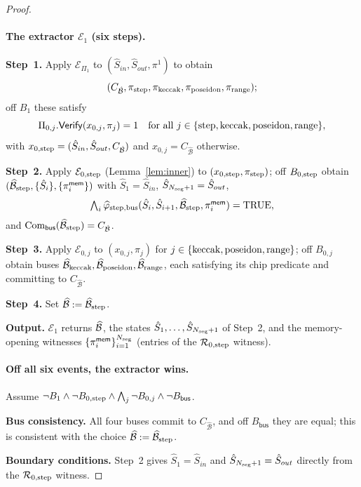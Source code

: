 \begin{proof}
\paragraph{The extractor $\mathcal{E}_1$ (six steps).}

\textbf{Step~1.} Apply $\mathcal{E}_{\Pi_1}$ to $(\hat{S}_{in},\hat{S}_{out},\pi^1)$
to obtain
\[
  (C_{\hat{\mathcal{B}}},\pi_{\mathrm{step}},\pi_{\mathrm{keccak}},\pi_{\mathrm{poseidon}},\pi_{\mathrm{range}});
\]
off $B_1$ these satisfy
\[
  \Pi_{0,j}.\mathsf{Verify}(x_{0,j},\pi_j)=1
  \quad\text{for all }j\in\{\mathrm{step},\mathrm{keccak},\mathrm{poseidon},\mathrm{range}\},
\]
with $x_{0,\mathrm{step}}=(\hat{S}_{in},\hat{S}_{out},C_{\hat{\mathcal{B}}})$ and
$x_{0,j}=C_{\hat{\mathcal{B}}}$ otherwise.

\textbf{Step~2.} Apply $\mathcal{E}_{0,\mathrm{step}}$ (Lemma~\ref{lem:inner}) to
$(x_{0,\mathrm{step}},\pi_{\mathrm{step}})$; off $B_{0,\mathrm{step}}$ obtain
$(\widehat{\mathcal{B}}_{\mathrm{step}},\{\hat{S}_i\},\{\pi^{\mathsf{mem}}_i\})$ with
$\hat{S}_1=\hat{S}_{in}$, $\hat{S}_{N_{\mathrm{seg}}+1}=\hat{S}_{out}$,
\[
  \textstyle\bigwedge_i\widehat{\varphi}_{\mathrm{step},\mathrm{bus}}(\hat{S}_i,\hat{S}_{i+1},\widehat{\mathcal{B}}_{\mathrm{step}},\pi^{\mathsf{mem}}_i)=\mathrm{TRUE},
\]
and $\mathrm{Com}_{\mathsf{bus}}(\widehat{\mathcal{B}}_{\mathrm{step}})=C_{\hat{\mathcal{B}}}$.

\textbf{Step~3.} Apply $\mathcal{E}_{0,j}$ to $(x_{0,j},\pi_j)$ for
$j\in\{\mathrm{keccak},\mathrm{poseidon},\mathrm{range}\}$; off $B_{0,j}$ obtain buses
$\widehat{\mathcal{B}}_{\mathrm{keccak}},\widehat{\mathcal{B}}_{\mathrm{poseidon}},\widehat{\mathcal{B}}_{\mathrm{range}}$,
each satisfying its chip predicate and committing to $C_{\hat{\mathcal{B}}}$.

\textbf{Step~4.} Set $\widehat{\mathcal{B}}:=\widehat{\mathcal{B}}_{\mathrm{step}}$.

\textbf{Output.} $\mathcal{E}_1$ returns $\widehat{\mathcal{B}}$, the states
$\hat{S}_1,\ldots,\hat{S}_{N_{\mathrm{seg}}+1}$ of Step~2, and the memory-opening
witnesses $\{\pi^{\mathsf{mem}}_i\}_{i=1}^{N_{\mathrm{seg}}}$ (entries of the
$\mathcal{R}_{0,\mathrm{step}}$ witness).

\paragraph{Off all six events, the extractor wins.}
Assume $\neg B_1\wedge\neg B_{0,\mathrm{step}}\wedge\bigwedge_{j}\neg B_{0,j}\wedge\neg B_{\mathsf{bus}}$.

\textbf{Bus consistency.} All four buses commit to $C_{\hat{\mathcal{B}}}$, and
off $B_{\mathsf{bus}}$ they are equal; this is consistent with the choice
$\widehat{\mathcal{B}}:=\widehat{\mathcal{B}}_{\mathrm{step}}$.

\textbf{Boundary conditions.} Step~2 gives $\hat{S}_1=\hat{S}_{in}$ and
$\hat{S}_{N_{\mathrm{seg}}+1}=\hat{S}_{out}$ directly from the $\mathcal{R}_{0,\mathrm{step}}$
witness.


\end{proof}

